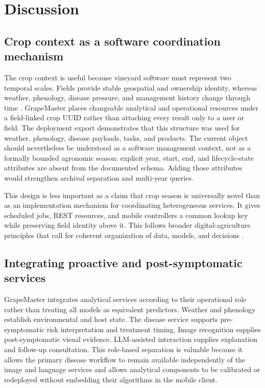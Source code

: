 \documentclass[12pt]{article}
\begin{document}
\section{Discussion}\label{discussion}

\subsection{Crop context as a software coordination mechanism}\label{crop-season-as-the-organizational-anchor-for-grapevine-disease-management}

The crop context is useful because vineyard software must represent two temporal scales. Fields provide stable geospatial and ownership identity, whereas weather, phenology, disease pressure, and management history change through time \citep{nogueirajuniorModellingDynamicsGrapevine2018,bregaglioPublicDecisionSupport2022}. GrapeMaster places changeable analytical and operational resources under a field-linked crop UUID rather than attaching every result only to a user or field. The deployment export demonstrates that this structure was used for weather, phenology, disease payloads, tasks, and products. The current object should nevertheless be understood as a software management context, not as a formally bounded agronomic season: explicit year, start, end, and lifecycle-state attributes are absent from the documented schema. Adding those attributes would strengthen archival separation and multi-year queries.

This design is less important as a claim that crop season is universally novel than as an implementation mechanism for coordinating heterogeneous services. It gives scheduled jobs, REST resources, and mobile controllers a common lookup key while preserving field identity above it. This follows broader digital-agriculture principles that call for coherent organization of data, models, and decisions \citep{romera2024digitalization,bakirScalableEndtoendIoT2026}.

\subsection{Integrating proactive and post-symptomatic services}\label{modular-platform-architecture-for-evolving-disease-management-systems}

GrapeMaster integrates analytical services according to their operational role rather than treating all models as equivalent predictors. Weather and phenology establish environmental and host state. The disease service supports pre-symptomatic risk interpretation and treatment timing. Image recognition supplies post-symptomatic visual evidence. LLM-assisted interaction supplies explanation and follow-up consultation. This role-based separation is valuable because it allows the primary disease workflow to remain available independently of the image and language services and allows analytical components to be calibrated or redeployed without embedding their algorithms in the mobile client.
\end{document}
